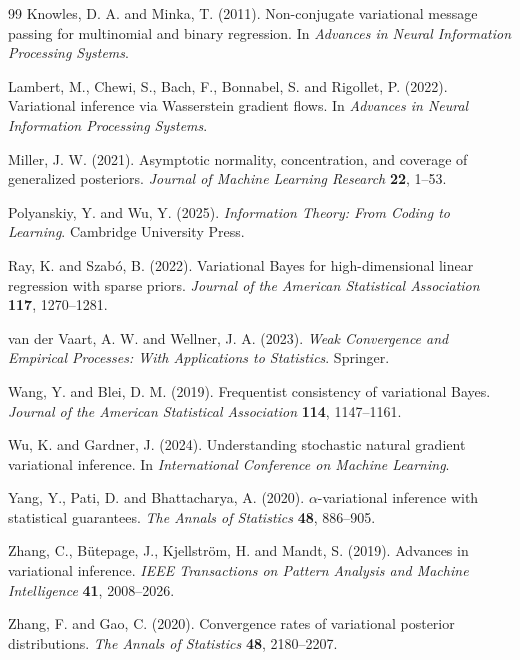 \documentclass[11pt]{article}
\theoremstyle{plain}
\theoremstyle{definition}
\theoremstyle{remark}
\begin{document}
\begin{thebibliography}{99}
Knowles, D. A. and Minka, T. (2011).
Non-conjugate variational message passing for multinomial and binary regression.
In \emph{Advances in Neural Information Processing Systems}.

Lambert, M., Chewi, S., Bach, F., Bonnabel, S. and Rigollet, P. (2022).
Variational inference via Wasserstein gradient flows.
In \emph{Advances in Neural Information Processing Systems}.

Miller, J. W. (2021).
Asymptotic normality, concentration, and coverage of generalized posteriors.
\emph{Journal of Machine Learning Research} \textbf{22}, 1--53.

Polyanskiy, Y. and Wu, Y. (2025).
\emph{Information Theory: From Coding to Learning}.
Cambridge University Press.

Ray, K. and Szab{\'o}, B. (2022).
Variational Bayes for high-dimensional linear regression with sparse priors.
\emph{Journal of the American Statistical Association} \textbf{117}, 1270--1281.

van der Vaart, A. W. and Wellner, J. A. (2023).
\emph{Weak Convergence and Empirical Processes: With Applications to Statistics}.
Springer.

Wang, Y. and Blei, D. M. (2019).
Frequentist consistency of variational Bayes.
\emph{Journal of the American Statistical Association} \textbf{114}, 1147--1161.

Wu, K. and Gardner, J. (2024).
Understanding stochastic natural gradient variational inference.
In \emph{International Conference on Machine Learning}.

Yang, Y., Pati, D. and Bhattacharya, A. (2020).
$\alpha$-variational inference with statistical guarantees.
\emph{The Annals of Statistics} \textbf{48}, 886--905.

Zhang, C., B{\"u}tepage, J., Kjellstr{\"o}m, H. and Mandt, S. (2019).
Advances in variational inference.
\emph{IEEE Transactions on Pattern Analysis and Machine Intelligence} \textbf{41}, 2008--2026.

Zhang, F. and Gao, C. (2020).
Convergence rates of variational posterior distributions.
\emph{The Annals of Statistics} \textbf{48}, 2180--2207.

\end{thebibliography}
\end{document}
